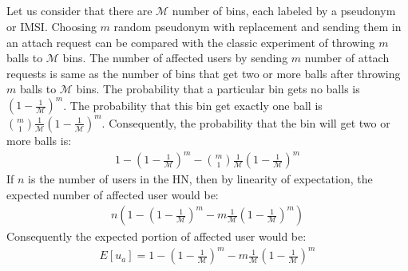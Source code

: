 \documentclass{llncs} %
\begin{document}
\begin{subappendices}
\renewcommand{\thesection}{\Alph{section}}%

\section{} \label{appendix:A}
Let us consider that there are $\mathcal{M}$ number of bins, each labeled by a pseudonym or IMSI. Choosing $m$ random pseudonym with replacement and sending them in an attach request can be compared with the classic experiment of throwing $m$ balls to $\mathcal{M}$ bins. The number of affected users by sending $m$ number of attach requests is same as the number of bins that get two or more balls after throwing $m$ balls to $\mathcal{M}$ bins. The probability that a particular bin gets no balls is $\left(1-\frac{1}{\mathcal{M}}\right)^m$. The probability that this bin get exactly one ball is $\binom{m}{1}\frac{1}{\mathcal{M}}\left(1-\frac{1}{\mathcal{M}}\right)^m$. Consequently, the probability that the bin will get two or more balls is:
\begin{eqnarray*}
 1 - \left(1-\frac{1}{\mathcal{M}}\right)^m - \binom{m}{1}\frac{1}{\mathcal{M}}\left(1-\frac{1}{\mathcal{M}}\right)^m
\end{eqnarray*}
If $n$ is the number of users in the HN, then by linearity of expectation, the expected number of affected user would be:
\begin{eqnarray*}
 n\left(1 - \left(1-\frac{1}{\mathcal{M}}\right)^m - m\frac{1}{\mathcal{M}}\left(1-\frac{1}{\mathcal{M}}\right)^m\right)
\end{eqnarray*}
Consequently the expected portion of affected user would be:
\begin{eqnarray*}
 E[u_a] = 1 - \left(1-\frac{1}{\mathcal{M}}\right)^m - m\frac{1}{\mathcal{M}}\left(1-\frac{1}{\mathcal{M}}\right)^m
\end{eqnarray*}



\end{subappendices}
\end{document}
